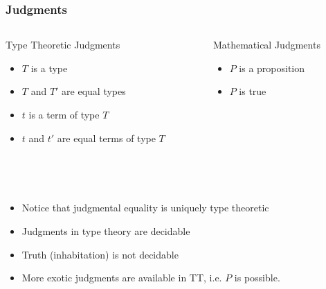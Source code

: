 \documentclass[9pt]{beamer}
\begin{document}
\begin{frame}

\frametitle{Judgments}

\begin{columns}

\begin{column}{0.4 \textwidth}
\begin{block}{Type Theoretic Judgments}
  \begin{itemize}
  \item $T$ is a type
  \item $T$ and $T'$ are equal types
  \item $t$ is a term of type $T$
  \item $t$ and $t'$ are equal terms of type $T$
  \end{itemize}
\end{block}
\end{column}

\begin{column}{0.4 \textwidth}
\begin{block}{Mathematical Judgments}
  \begin{itemize}
  \item $P$ is a proposition
  \item $P$ is true
  \end{itemize}
\end{block}
\end{column}
\end{columns}

\\~\\
\begin{itemize}
  \item Notice that judgmental equality is uniquely type theoretic
  \item Judgments in type theory are decidable
  \item Truth (inhabitation) is not decidable
  \item More exotic judgments are available in TT, i.e. $P$ is possible.
\end{itemize}

\end{frame}
\end{document}
